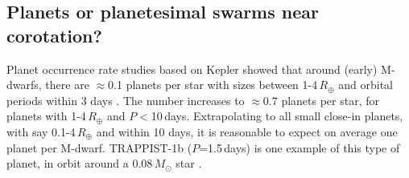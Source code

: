 \documentclass[11pt,twocolumn,tighten]{aastex63}
\begin{document}
%
%


\subsection{Planets or planetesimal swarms near corotation?}

Planet occurrence rate studies based on Kepler showed that around
(early) M-dwarfs, there are $\approx$0.1 planets per star with sizes
between 1-4\,$R_\oplus$ and orbital periods within 3 days
\citep{2015ApJ...807...45D}.  The number increases to $\approx$0.7
planets per star, for planets with 1-4\,$R_\oplus$ and $P$$<$10\,days.
Extrapolating to all small close-in planets, with say
0.1-4\,$R_\oplus$ and within 10 days, it is reasonable to expect on
average one planet per M-dwarf.  TRAPPIST-1b ($P$=1.5\,days) is one
example of this type of planet, in orbit around a 0.08\,$M_\odot$ star
\citep{2017Natur.542..456G}.
\end{document}
